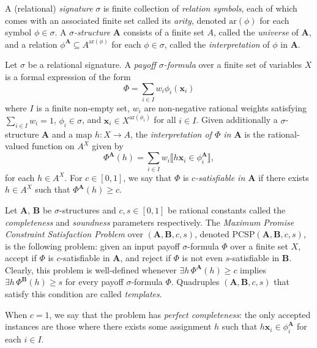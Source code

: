 \documentclass[a4paper,11pt]{article}
\theoremstyle{definition}
\newcommand{\tuple}[1]{{\mathbf{#1}}}
\newcommand{\bx}{\mathbf{x}}
\newcommand{\bfa}{\mathbf{A}}
\newcommand{\bfb}{\mathbf{B}}
\newcommand{\abcs}{(\bfa,\bfb,c,s)}
\newcommand{\pcsp}{\mathrm{PCSP}}
\newcommand{\sig}{\sigma}
\newcommand{\ar}{\mathrm{ar}}
\begin{document}
A (relational) \emph{signature} $\sigma$ is finite collection of \emph{relation symbols}, each of which comes with an associated finite set called its \emph{arity}, denoted $\ar(\phi)$ for each symbol $\phi \in \sigma$.
A $\sigma$\emph{-structure} $\bfa$ consists of a finite set $A$, called the \emph{universe} of $\bfa$, and a relation $\phi^\bfa \subseteq A^{\ar(\phi)}$ for each $\phi \in \sigma$, called the \emph{interpretation} of $\phi$ in $\bfa$.

Let $\sigma$ be a relational signature. A \emph{payoff $\sigma$-formula} over a
finite set of variables $X$ is a formal expression of the form 
\[\Phi = \sum_{i
\in I} w_i \phi_i(\tuple{x}_i)\]
where $I$ is a finite non-empty set, $w_i$ are non-negative rational weights satisfying $\sum_{i\in I}w_i=1$, $\phi_i \in \sig$, and $\tuple{x}_i \in X^{\ar(\phi_i)}$ for all $i \in I$.
    Given additionally a $\sigma$-structure $\bfa$ and a map $h:X\to A$, the \emph{interpretation of $\Phi$ in $\bfa$} is the rational-valued function on $A^X$ given by 
   \[ 
    \Phi^{\bfa}(h) = \sum_{i \in I} w_i \llbracket h\tuple{x}_i \in \phi_i^{\bfa}\rrbracket,
   \] 
    for each $h \in A^X$.
    For $c \in [0,1]$, we say that $\Phi$ is \emph{$c$-satisfiable in $\bfa$} if there exists $h \in A^X$ such that $\Phi^\bfa(h) \geq c$.

Let $\bfa$, $\bfb$ be $\sigma$-structures and $c,s \in [0,1]$ be rational constants called the \emph{completeness} and \emph{soundness} parameters respectively. The \emph{Maximum Promise Constraint Satisfaction Problem} over $(\bfa,\bfb,c,s)$, denoted $\pcsp\abcs$, is the following problem: given an input payoff $\sigma$-formula $\Phi$ over a finite set $X$, accept if $\Phi$ is $c$-satisfiable in $\bfa$, and reject if $\Phi$ is not even $s$-satisfiable in $\bfb$. Clearly, this problem is well-defined whenever $\exists h \, \Phi^{\bfa}(h) \geq c$ implies $\exists h \, \Phi^{\bfb}(h) \geq s$ for every payoff $\sigma$-formula $\Phi$. Quadruples $\abcs$ that satisfy this condition are called \emph{templates}.

When $c=1$, we say that the problem has \emph{perfect completeness}: the only accepted instances are those where there exists some assignment $h$ such that $h\bx_i \in \phi_i^\bfa$ for each $i \in I$.
\end{document}
